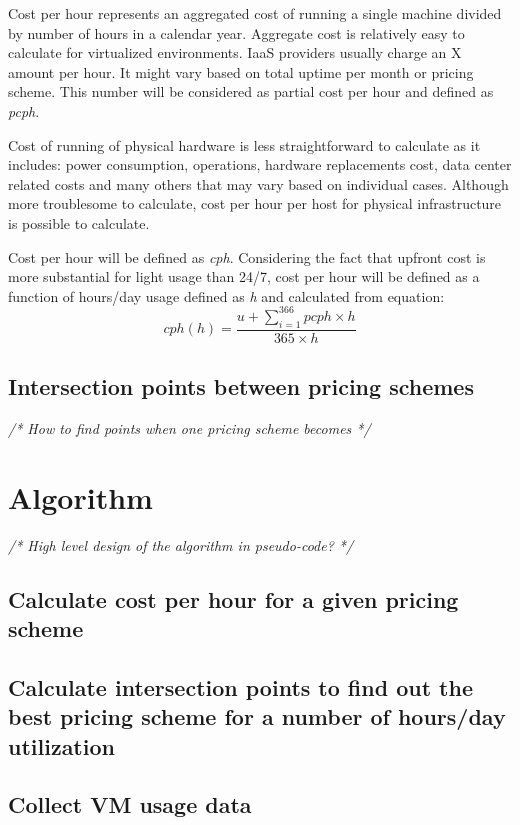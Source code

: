 \documentclass[]{final_report}
\begin{document}
Cost per hour represents an aggregated cost of running a single machine divided by number of hours in a calendar year. Aggregate cost is relatively easy to calculate for virtualized environments. IaaS providers usually charge an X amount per hour. It might vary based on total uptime per month or pricing scheme. This number will be considered as partial cost per hour and defined as \textit{pcph}. \par
Cost of running of physical hardware is less straightforward to calculate as it includes: power consumption, operations, hardware replacements cost, data center related costs and many others that may vary based on individual cases. Although more troublesome to calculate, cost per hour per host for physical infrastructure is possible to calculate. \par
Cost per hour will be defined as \textit{cph}. Considering the fact that upfront cost is more substantial for light usage than 24/7, cost per hour will be defined as a function of hours/day usage defined as \textit{h} and calculated from equation:
\begin{equation}
cph(h) = \frac{u + \sum_{i=1}^{366} pcph \times h}{365 \times h}
\end{equation}

\subsection{Intersection points between pricing schemes}
\emph{/* How to find points when one pricing scheme becomes */}

\section{Algorithm}

\emph{/* High level design of the algorithm in pseudo-code? */}

\subsection{Calculate cost per hour for a given pricing scheme}
\subsection{Calculate intersection points to find out the best pricing scheme for a number of hours/day utilization}
\subsection{Collect VM usage data}
\end{document}
